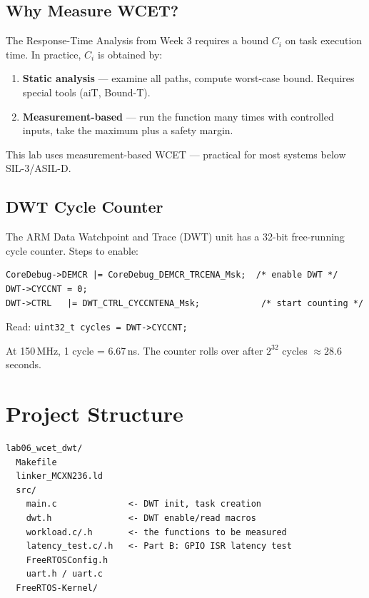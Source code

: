\documentclass[11pt, a4paper]{article}
\begin{document}
\subsection{Why Measure WCET?}

The Response-Time Analysis from Week 3 requires a bound $C_i$ on task execution time. In
practice, $C_i$ is obtained by:

\begin{enumerate}[noitemsep, leftmargin=*]
  \item \textbf{Static analysis} --- examine all paths, compute worst-case bound.
        Requires special tools (aiT, Bound-T).
  \item \textbf{Measurement-based} --- run the function many times with controlled
        inputs, take the maximum plus a safety margin.
\end{enumerate}

This lab uses measurement-based WCET --- practical for most systems below SIL-3/ASIL-D.

\subsection{DWT Cycle Counter}

The ARM Data Watchpoint and Trace (DWT) unit has a 32-bit free-running cycle counter.
Steps to enable:

\begin{lstlisting}[style=cstyle]
CoreDebug->DEMCR |= CoreDebug_DEMCR_TRCENA_Msk;  /* enable DWT */
DWT->CYCCNT = 0;
DWT->CTRL   |= DWT_CTRL_CYCCNTENA_Msk;            /* start counting */
\end{lstlisting}

Read: \texttt{uint32\_t cycles = DWT->CYCCNT;}

At 150\,MHz, 1 cycle = 6.67\,ns. The counter rolls over after $2^{32}$ cycles
$\approx 28.6$\,seconds.

\section{Project Structure}

\begin{lstlisting}[style=textstyle]
lab06_wcet_dwt/
  Makefile
  linker_MCXN236.ld
  src/
    main.c              <- DWT init, task creation
    dwt.h               <- DWT enable/read macros
    workload.c/.h       <- the functions to be measured
    latency_test.c/.h   <- Part B: GPIO ISR latency test
    FreeRTOSConfig.h
    uart.h / uart.c
  FreeRTOS-Kernel/
\end{lstlisting}
\end{document}

